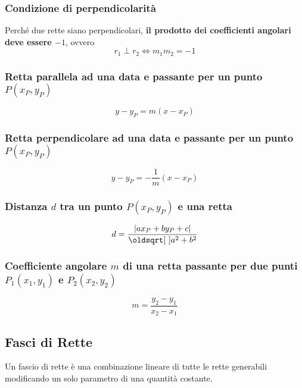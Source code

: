 \subsubsection{Condizione di perpendicolarità}
Perché due rette siano perpendicolari, \textbf{il prodotto dei coefficienti angolari deve essere $-1$},
ovvero
\begin{equation*}
  r_1 \perp r_2 \iff m_1m_2 = -1
\end{equation*}

\subsubsection{Retta parallela ad una data e passante per un punto $P(x_P,y_P)$}
\begin{equation*}
  y-y_P = m(x-x_P)
\end{equation*}

\subsubsection{Retta perpendicolare ad una data e passante per un punto $P(x_P,y_P)$}
\begin{equation*}
  y - y_P = -\frac{1}{m} (x - x_P)
\end{equation*}

\subsubsection{Distanza $d$ tra un punto $P(x_P,y_P)$ e una retta}
\begin{equation*}
  d = \frac{\abs{ax_P + by_P +c}}{\sqrt{a^2+b^2}}
\end{equation*}

\subsubsection{Coefficiente angolare $m$ di una retta passante per due punti $P_1(x_1,y_1)$ e 
$P_2(x_2,y_2)$}
\begin{equation*}
  m=\frac{y_2-y_1}{x_2-x_1}
\end{equation*}

\subsection{Fasci di Rette}\label{subsec:geomanal:fasciorette}
Un fascio di rette è una combinazione lineare di tutte le rette generabili modificando un solo 
parametro di una quantità costante.


